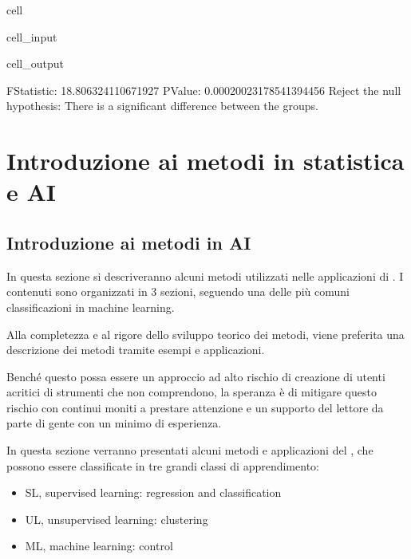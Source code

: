 \documentclass[letterpaper,10pt,italian]{jupyterBook}
\begin{document}
\begin{sphinxuseclass}{cell}
\begin{sphinxVerbatimInput}
\begin{sphinxuseclass}{cell_input}
\end{sphinxuseclass}\end{sphinxVerbatimInput}
\begin{sphinxVerbatimOutput}

\begin{sphinxuseclass}{cell_output}
\begin{sphinxVerbatim}[commandchars=\\\{\}]
F\PYGZhy{}Statistic: 18.806324110671927
P\PYGZhy{}Value: 0.00020023178541394456
Reject the null hypothesis: There is a significant difference between the groups.
\end{sphinxVerbatim}

\end{sphinxuseclass}\end{sphinxVerbatimOutput}

\end{sphinxuseclass}
\sphinxstepscope


\part{Introduzione ai metodi in statistica e  AI}

\sphinxstepscope


\chapter{Introduzione ai metodi in AI}
\label{\detokenize{ch/ai:introduzione-ai-metodi-in-ai}}\label{\detokenize{ch/ai:book-ai-hs}}\label{\detokenize{ch/ai::doc}}
\sphinxAtStartPar
In questa sezione si descriveranno alcuni metodi utilizzati nelle applicazioni di . I contenuti sono organizzati in 3 sezioni, seguendo una delle più comuni classificazioni in machine learning.

\sphinxAtStartPar
{} Alla completezza e al rigore dello sviluppo teorico dei metodi, viene preferita una descrizione dei metodi tramite esempi e applicazioni.

\sphinxAtStartPar
Benché questo possa essere un approccio ad alto rischio di creazione di utenti acritici di strumenti che non comprendono, la speranza è di mitigare questo rischio con continui moniti a prestare attenzione e un supporto del lettore da parte di gente con un minimo di esperienza.

\sphinxAtStartPar
{} In questa sezione verranno presentati alcuni metodi e applicazioni del , che possono essere classificate in tre grandi classi di apprendimento:
\begin{itemize}
\item {} 
\sphinxAtStartPar
SL, supervised learning: regression and classification

\item {} 
\sphinxAtStartPar
UL, unsupervised learning: clustering

\item {} 
\sphinxAtStartPar
ML, machine learning: control

\end{itemize}
\end{document}
